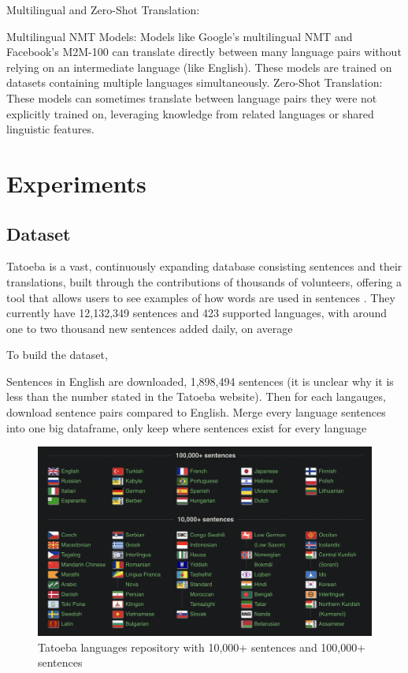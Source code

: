 \documentclass[a4paper]{article}
\begin{document}
Multilingual and Zero-Shot Translation:

Multilingual NMT Models: Models like Google's multilingual NMT and Facebook's M2M-100 can translate directly between many language pairs without relying on an intermediate language (like English). These models are trained on datasets containing multiple languages simultaneously.
Zero-Shot Translation: These models can sometimes translate between language pairs they were not explicitly trained on, leveraging knowledge from related languages or shared linguistic features.

\section{Experiments}

\subsection{Dataset}

Tatoeba is a vast, continuously expanding database consisting sentences and their translations, built through the contributions of thousands of volunteers, offering a tool that allows users to see examples of how words are used in sentences \cite{tatoeba}. They currently have 12,132,349 sentences and 423 supported languages, with around one to two thousand new sentences added daily, on average

To build the dataset,

Sentences in English are downloaded, 1,898,494 sentences (it is unclear why it is less than the number stated in the Tatoeba website). Then for each langauges, download sentence pairs compared to English. Merge every language sentences into one big dataframe, only keep where sentences exist for every language

\begin{figure}[htbp]
    \centering
    \includegraphics[width=0.9\linewidth]{images/tatoeba_languages.png}
    \caption{Tatoeba languages repository with 10,000+ sentences and 100,000+ sentences \cite{tatoeba}}
    \label{fig:tatoeba_languages}
\end{figure}
\end{document}
